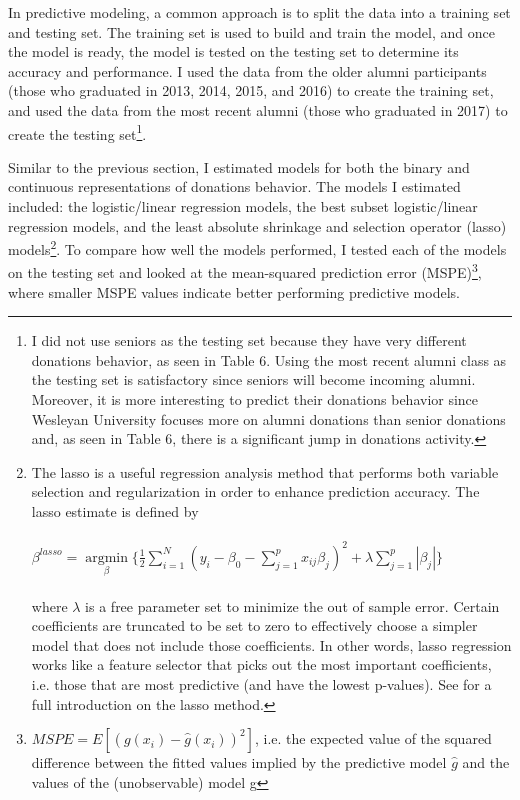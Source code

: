 \documentclass[12pt]{article}
\begin{document}
In predictive modeling, a common approach is to split the data into a training set and testing set. The training set is used to build and train the model, and once the model is ready, the model is tested on the testing set to determine its accuracy and performance. I used the data from the older alumni participants (those who graduated in 2013, 2014, 2015, and 2016) to create the training set, and used the data from the most recent alumni (those who graduated in 2017) to create the testing set\footnote{I did not use seniors as the testing set because they have very different donations behavior, as seen in Table 6. Using the most recent alumni class as the testing set is satisfactory since seniors will become incoming alumni. Moreover, it is more interesting to predict their donations behavior since Wesleyan University focuses more on alumni donations than senior donations and, as seen in Table 6, there is a significant jump in donations activity.}. 

Similar to the previous section, I estimated models for both the binary and continuous representations of donations behavior. The models I estimated included: the logistic/linear regression models, the best subset logistic/linear regression models, and the least absolute shrinkage and selection operator (lasso) models\footnote{The lasso is a useful regression analysis method that performs both variable selection and regularization in order to enhance prediction accuracy. The lasso estimate is defined by\\ \\
\( \beta^{lasso}=\mathop\mathrm{argmin}\limits_{\beta} \{ \frac{1}{2} \sum_{i=1}^{N} (y_{i} - \beta_{0} - \sum_{j=1}^{p}x_{ij}\beta _{j})^{2}+\lambda\sum_{j=1}^{p}|\beta _{j}|\} \) \\ \\
where \(\lambda\) is a free parameter set to minimize the out of sample error. Certain coefficients are truncated to be set to zero to effectively choose a simpler model that does not include those coefficients. In other words, lasso regression works like a feature selector that picks out the most important coefficients, i.e. those that are most predictive (and have the lowest p-values). See \cite{tibshirani_1996} for a full introduction on the lasso method.}. To compare how well the models performed, I tested each of the models on the testing set and looked at the mean-squared prediction error (MSPE)\footnote{\(MSPE = E[(g(x_{i}) - \hat{g}(x_{i}))^{2}]\), i.e. the expected value of the squared difference between the fitted values implied by the predictive model \(\hat{g}\) and the values of the (unobservable) model g}, where smaller MSPE values indicate better performing predictive models.
\end{document}
